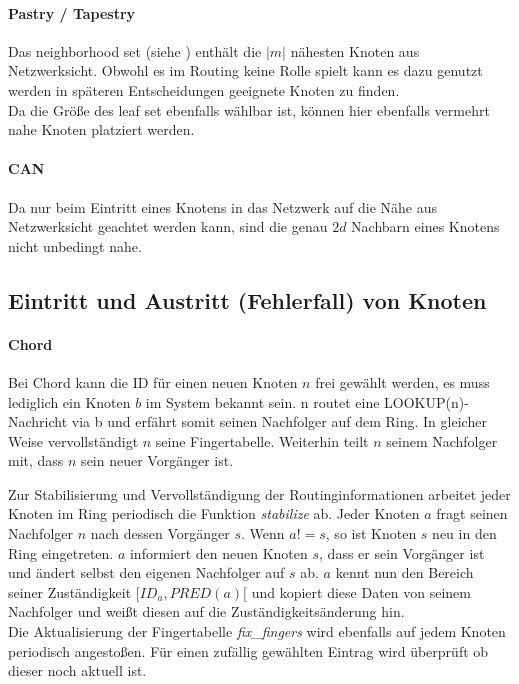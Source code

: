 \paragraph{Pastry / Tapestry}
Das neighborhood set (siehe ) enthält die $|m|$ nähesten Knoten aus Netzwerksicht. Obwohl es im Routing keine Rolle spielt kann es dazu genutzt werden in späteren Entscheidungen geeignete Knoten zu finden.\\
Da die Größe des leaf set ebenfalls wählbar ist, können hier ebenfalls vermehrt nahe Knoten platziert werden.


\paragraph{CAN}
Da nur beim Eintritt eines Knotens in das Netzwerk auf die Nähe aus Netzwerksicht geachtet werden kann, sind die genau $2d$ Nachbarn eines Knotens nicht unbedingt nahe.

\subsection{Eintritt und Austritt (Fehlerfall) von Knoten}
\paragraph{Chord}
Bei Chord kann die ID für einen neuen Knoten $n$ frei gewählt werden, es muss lediglich ein Knoten $b$ im System bekannt sein. n routet eine LOOKUP(n)-Nachricht via b und erfährt somit seinen Nachfolger auf dem Ring. In gleicher Weise vervollständigt $n$ seine Fingertabelle. Weiterhin teilt $n$ seinem Nachfolger mit, dass $n$ sein neuer Vorgänger ist.

Zur Stabilisierung und Vervollständigung der Routinginformationen arbeitet jeder Knoten im Ring periodisch die Funktion \emph{stabilize} ab. Jeder Knoten $a$ fragt seinen Nachfolger $n$ nach dessen Vorgänger $s$. Wenn $a != s$, so ist Knoten $s$ neu in den Ring eingetreten. $a$ informiert den neuen Knoten $s$, dass er sein Vorgänger ist und ändert selbst den eigenen Nachfolger auf $s$ ab. $a$ kennt nun den Bereich seiner Zuständigkeit $[ID_a, PRED(a)[$ und kopiert diese Daten von seinem Nachfolger und weißt diesen auf die Zuständigkeitsänderung hin.\\
Die Aktualisierung der Fingertabelle \emph{fix\_fingers} wird ebenfalls auf jedem Knoten periodisch angestoßen. Für einen zufällig gewählten Eintrag wird überprüft ob dieser noch aktuell ist.

